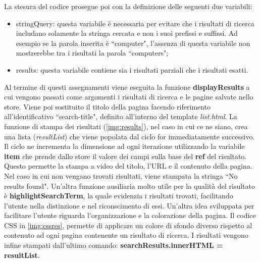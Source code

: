 \documentclass[target=bach,aauheader=]{thud}
\begin{document}
\begin{enumerate}
    \newline \newline
    La stesura del codice prosegue poi con la definizione delle seguenti due variabili:
    \begin{itemize}
        \item stringQuery: questa variabile è necessaria per evitare che i risultati di ricerca includano solamente la stringa cercata e non i suoi prefissi e suffissi. Ad esempio se la parola inserita è ``computer", l'assenza di questa variabile non mostrerebbe tra i risultati la parola ``computers";
        \item results: questa variabile contiene sia i risultati parziali che i risultati esatti.
    \end{itemize}
    Al termine di questi assegnamenti viene eseguita la funzione \textbf{displayResults} a cui vengono passati come argomenti i risultati di ricerca e le pagine salvate nello store. Viene poi sostituito il titolo della pagina facendo riferimento all'identificativo ``search-title", definito all'interno del template \textit{list.html}. 
    \newline \newline
    La funzione di stampa dei risultati (\cref{img:results}), nel caso in cui ce ne siano, crea una lista (\textit{resultList}) che viene popolata dal ciclo for immediatamente successivo. Il ciclo ne incrementa la dimensione ad ogni iterazione utilizzando la variabile \textbf{item} che prende dallo store il valore dei campi sulla base del \textbf{ref} del risultato. 
    Questo permette la stampa a video del titolo, l'URL e il contenuto della pagina. Nel caso in cui non vengano trovati risultati, viene stampata la stringa ``No results found".
    \newline \newline
    Un'altra funzione ausiliaria molto utile per la qualità del risultato è \textbf{highlightSearchTerm}, la quale evidenzia i risultati trovati, facilitando l'utente nella distinzione e nel riconscimento di essi. 
    \newline
    Un'altra idea sviluppata per facilitare l'utente riguarda l'organizzazione e la colorazione della pagina. Il codice CSS in \cref{img:cssres}, permette di applicare un colore di sfondo diverso rispetto al contenuto ad ogni pagina contenente un risultato di ricerca. 
    \newline \newline
    I risultati vengono infine stampati dall'ultimo comando: \textbf{searchResults.innerHTML = resultList}.

\end{enumerate}
\end{document}
